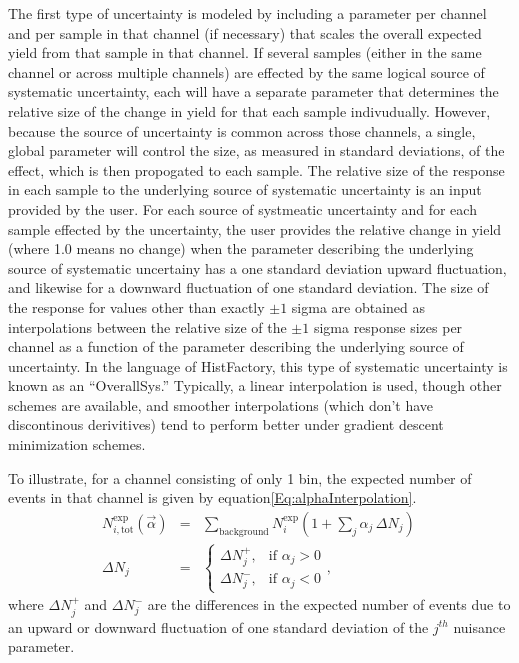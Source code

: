 The first type of uncertainty is modeled by including a parameter per channel and per sample in that channel (if necessary) that scales the overall expected yield from that sample in that channel.
If several samples (either in the same channel or across multiple channels) are effected by the same logical source of systematic uncertainty, each will have a separate parameter that determines the relative size of the change in yield for that each sample indivudually.
However, because the source of uncertainty is common across those channels, a single, global parameter will control the size, as measured in standard deviations, of the effect, which is then propogated to each sample.
The relative size of the response in each sample to the underlying source of systematic uncertainty is an input provided by the user.
For each source of systmeatic uncertainty and for each sample effected by the uncertainty, the user provides the relative change in yield (where 1.0 means no change) when the parameter describing the underlying source of systematic uncertainy has a one standard deviation upward fluctuation, and likewise for a downward fluctuation of one standard deviation.
The size of the response for values other than exactly $\pm 1$ sigma are obtained as interpolations between the relative size of the $\pm 1$ sigma response sizes per channel as a function of the parameter describing the underlying source of uncertainty.
In the language of HistFactory, this type of systematic uncertainty is known as an ``OverallSys.''
Typically, a linear interpolation is used, though other schemes are available, and smoother interpolations (which don't have discontinous derivitives) tend to perform better under gradient descent minimization schemes.

To illustrate, for a channel consisting of only 1 bin, the expected number of events in that channel is given by equation\ref{Eq:alphaInterpolation}.
\begin{eqnarray}\label{Eq:alphaInterpolation}
N^{\text{exp}}_{i, \text{tot}}(\vec{\alpha}) &=& \sum_{\text{background}} N^{\text{exp}}_{i} (1 + \sum_{j} \alpha_{j} \, \Delta N_j  ) \, \\
\Delta N_j &=& \begin{cases} \Delta N^{+}_{j}, & \mbox{if } \alpha_{j} > 0  \\ \Delta N^{-}_{j}, & \mbox{if } \alpha_{j} < 0 \end{cases},
\end{eqnarray}
where $\Delta N^{+}_{j}$ and $\Delta N^{-}_{j}$ are the differences in the expected number of events due to an upward or downward fluctuation
of one standard deviation of the $j^{th}$ nuisance parameter.

